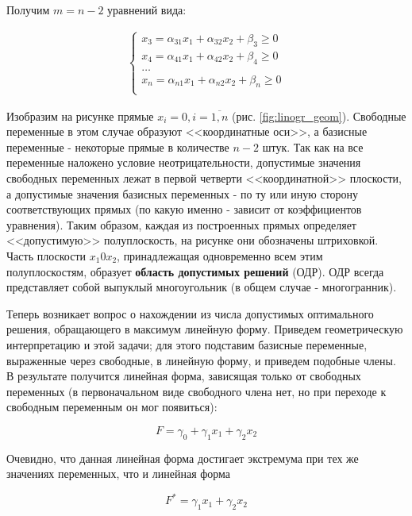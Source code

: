 \documentclass[a4paper,12pt]{report}
\begin{document}
Получим $m = n - 2$ уравнений вида:

\begin{align*}
\begin{cases}
x_{3} = \alpha_{31}x_{1} + \alpha_{32}x_{2} + \beta_{3} \geq 0 \\
x_{4} = \alpha_{41}x_{1} + \alpha_{42}x_{2} + \beta_{4} \geq 0 \\
\ldots \\
x_{n} = \alpha_{n1}x_{1} + \alpha_{n2}x_{2} + \beta_{n} \geq 0 \\
\end{cases}	
\end{align*}

Изобразим на рисунке прямые $x_{i} = 0, i=\overline{1,n}$ (рис. \ref{fig:linogr_geom}). Свободные переменные в этом случае образуют <<координатные оси>>, а базисные переменные - некоторые прямые в количестве $n-2$ штук. Так как на все переменные наложено условие неотрицательности, допустимые значения свободных переменных лежат в первой четверти <<координатной>> плоскости, а допустимые значения базисных переменных - по ту или иную сторону соответствующих прямых (по какую именно - зависит от коэффициентов уравнения). Таким образом, каждая из построенных прямых определяет <<допустимую>> полуплоскость, на рисунке они обозначены штриховкой. Часть плоскости $x_{1}0x_{2}$, принадлежащая одновременно всем этим полуплоскостям, образует \textbf{область допустимых решений} (ОДР). ОДР всегда представляет собой выпуклый многоугольник (в общем случае - многогранник).

Теперь возникает вопрос о нахождении из числа допустимых оптимального решения, обращающего в максимум линейную форму. Приведем геометрическую интерпретацию и этой задачи; для этого подставим базисные переменные, выраженные через свободные, в линейную форму, и приведем подобные члены. В результате получится линейная форма, зависящая только от свободных переменных (в первоначальном виде свободного члена нет, но при переходе к свободным переменным он мог появиться):

\begin{equation*}
F = \gamma_{0} + \gamma_{1}x_{1} + \gamma_{2}x_{2}
\end{equation*}

Очевидно, что данная линейная форма достигает экстремума при тех же значениях переменных, что и линейная форма

\begin{equation*}
F^{*} = \gamma_{1}x_{1} + \gamma_{2}x_{2}
\end{equation*}
\end{document}
